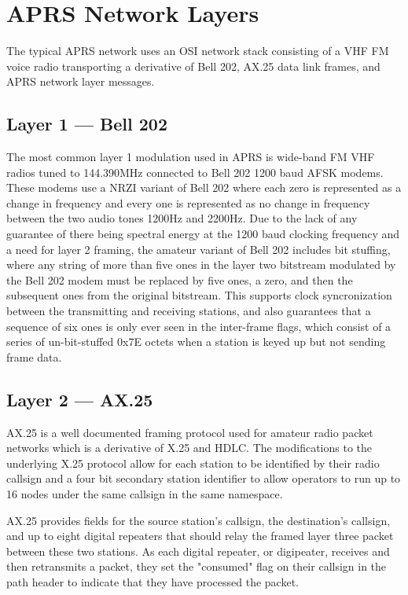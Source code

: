 \chapter{APRS Network Layers}

The typical APRS network uses an OSI network stack consisting of a VHF FM 
voice radio transporting a derivative of Bell 202, AX.25 data link frames,
and APRS network layer messages.

\section{Layer 1 --- Bell 202}

The most common layer 1 modulation used in APRS is wide-band FM VHF radios
tuned to 144.390MHz connected to Bell 202 1200 baud AFSK modems. These 
modems use a NRZI variant of Bell 202 where each zero is represented as a
change in frequency and every one is represented as no change in frequency
between the two audio tones 1200Hz and 2200Hz. Due to the lack of any
guarantee of there being spectral energy at the 1200 baud clocking 
frequency and a need for layer 2 framing, the amateur variant of Bell 202 
includes bit stuffing, where any string of more than five ones in the layer
two bitstream modulated by the Bell 202 modem must be replaced by five 
ones, a zero, and then the subsequent ones from the original bitstream.
This supports clock syncronization between the transmitting and receiving
stations, and also guarantees that a sequence of six ones is only ever seen
in the inter-frame flags, which consist of a series of un-bit-stuffed
0x7E octets when a station is keyed up but not sending frame data.

\section{Layer 2 --- AX.25}

AX.25 is a well documented framing protocol used for amateur radio packet
networks which is a derivative of X.25 and HDLC. The modifications to 
the underlying X.25 protocol allow for each station to be identified by 
their radio callsign and a four bit secondary station identifier to allow
operators to run up to 16 nodes under the same callsign in the same 
namespace.

AX.25 provides fields for the source station's callsign, the destination's
callsign, and up to eight digital repeaters that should relay the framed
layer three packet between these two stations. As each digital repeater,
or digipeater, receives and then retransmits a packet, they set the 
"consumed" flag on their callsign in the path header to indicate that 
they have processed the packet.

